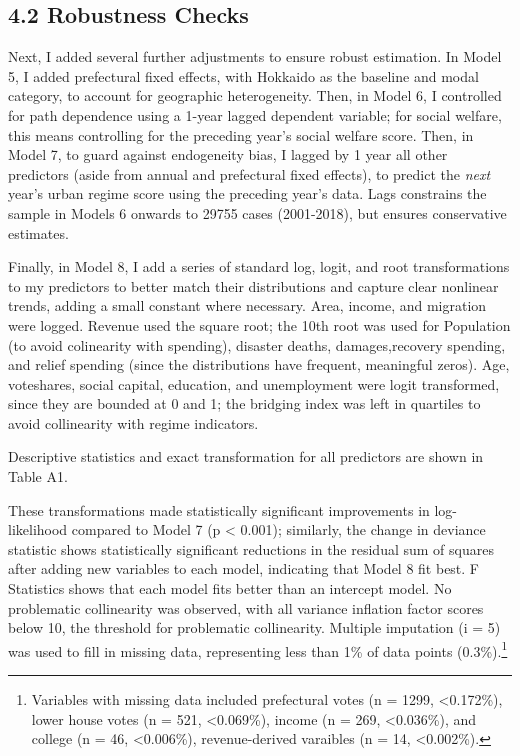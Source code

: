 \documentclass[preprint, 3p,
authoryear]{elsarticle} %
\begin{document}
\hypertarget{robustness-checks}{%
\subsection{4.2 Robustness Checks}\label{robustness-checks}}

Next, I added several further adjustments to ensure robust estimation.
In Model 5, I added prefectural fixed effects, with Hokkaido as the
baseline and modal category, to account for geographic heterogeneity.
Then, in Model 6, I controlled for path dependence using a 1-year lagged
dependent variable; for social welfare, this means controlling for the
preceding year's social welfare score. Then, in Model 7, to guard
against endogeneity bias, I lagged by 1 year all other predictors (aside
from annual and prefectural fixed effects), to predict the \emph{next}
year's urban regime score using the preceding year's data. Lags
constrains the sample in Models 6 onwards to 29755 cases (2001-2018),
but ensures conservative estimates.

Finally, in Model 8, I add a series of standard log, logit, and root
transformations to my predictors to better match their distributions and
capture clear nonlinear trends, adding a small constant where necessary.
Area, income, and migration were logged. Revenue used the square root;
the 10th root was used for Population (to avoid colinearity with
spending), disaster deaths, damages,recovery spending, and relief
spending (since the distributions have frequent, meaningful zeros). Age,
voteshares, social capital, education, and unemployment were logit
transformed, since they are bounded at 0 and 1; the bridging index was
left in quartiles to avoid collinearity with regime indicators.

Descriptive statistics and exact transformation for all predictors are
shown in Table A1.

These transformations made statistically significant improvements in
log-likelihood compared to Model 7 (p \textless{} 0.001); similarly, the
change in deviance statistic shows statistically significant reductions
in the residual sum of squares after adding new variables to each model,
indicating that Model 8 fit best. F Statistics shows that each model
fits better than an intercept model. No problematic collinearity was
observed, with all variance inflation factor scores below 10, the
threshold for problematic collinearity. Multiple imputation (i = 5) was
used to fill in missing data, representing less than 1\% of data points
(0.3\%).\footnote{Variables with missing data included prefectural votes
  (n = 1299, \textless0.172\%), lower house votes (n = 521,
  \textless0.069\%), income (n = 269, \textless0.036\%), and college (n
  = 46, \textless0.006\%), revenue-derived varaibles (n = 14,
  \textless0.002\%).}
\end{document}
